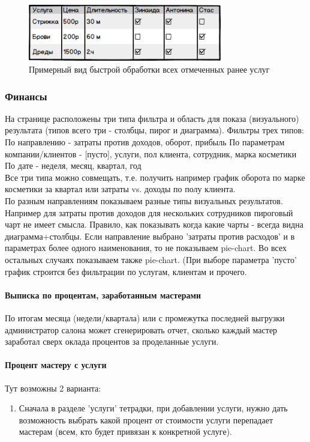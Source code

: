 \documentclass[DIV=calc, paper=a4, fontsize=11pt]{scrartcl} %
\begin{document}
		\begin{figure}[H]
        \centering
        \includegraphics[width=320px]{add_appointment_wizard_p1.png}
        \caption{Примерный вид быстрой обработки всех отмеченных ранее услуг\label{fig:add_appointment_wizard_p1.png}}
        \end{figure}


\subsubsection{Финансы}\label{subsubsec:finance}
На странице расположены три типа фильтра и область для показа (визуального) результата (типов всего три - столбцы, пирог и диаграмма). Фильтры трех типов:
По направлению - затраты против доходов, оборот, прибыль
По параметрам компании/клиентов - [пусто], услуги, пол клиента, сотрудник, марка косметики
По дате - неделя, месяц, квартал, год
\\[0.5cm]
Все три типа можно совмещать, т.е. получить например график оборота по марке косметики за квартал или затраты vs. доходы по полу клиента. 
\\[0.5cm]
По разным направлениям показываем разные типы визуальных результатов. Например для затраты против доходов для нескольких сотрудников пироговый чарт не имеет смысла. Правило, как показывать когда какие чарты - всегда видна диаграмма+столбцы. Если направление выбрано 'затраты против расходов' и в параметрах более одного наименования, то не показываем pie-chart. Во всех остальных случаях показываем также pie-chart. (При выборе параметра 'пусто' график строится без фильтрации по услугам, клиентам и прочего.

\paragraph{Выписка по процентам, заработанным мастерами}
По итогам месяца (недели/квартала) или с промежутка последней выгрузки администратор салона может сгенерировать отчет, сколько каждый мастер заработал сверх оклада процентов за проделанные услуги.

\paragraph{Процент мастеру с услуги}
Тут возможны 2 варианта:
\begin{enumerate}
	\item Сначала в разделе 'услуги' тетрадки, при добавлении услуги, нужно дать возможность выбрать какой процент от стоимости услуги перепадает мастерам (всем, кто будет привязан к конкретной услуге).
	\end{enumerate}
	
\end{document}
